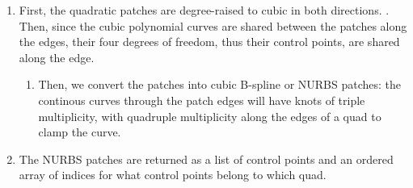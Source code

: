 \begin{enumerate}[resume]
\item First, the quadratic \Bez patches are degree-raised to cubic in both directions. . Then, since the cubic polynomial curves are shared between the patches along the edges, their four degrees of freedom, thus their control points, are shared along the edge.
\begin{enumerate} [label=(\alph*)]
\item Then, we convert the \Bez patches into cubic B-spline or NURBS patches: the continous curves through the \Bez patch edges will have knots of triple multiplicity, with quadruple multiplicity along the edges of a quad to clamp the curve. 
\end{enumerate}
\item The NURBS patches are returned as a list of control points and an ordered array of indices for what control points belong to which quad.
\end{enumerate}

